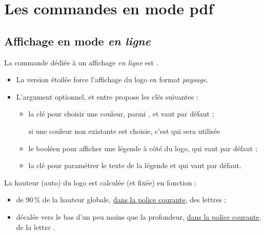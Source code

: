 \documentclass[french,11pt,a4paper]{article}
\begin{document}
\pagebreak

\section{Les commandes en mode pdf}

\subsection{Affichage en mode \textit{en ligne}}

La commande dédiée à un affichage \textit{en ligne} est .

\medskip

\begin{itemize}[leftmargin=*]
	\item La version étoilée force l'affichage du logo en format \textit{paysage}.
	\item L'argument optionnel, et entre \MontreCode{[...]} propose les clés suivantes :
	\begin{itemize}
		\item la clé  pour choisir une couleur, parmi , et vaut  par défaut ;
		
		\hfill{\footnotesize si une couleur non existante est choisie, c'est  qui sera utilisée}
		\item le booléen  pour afficher une légende à côté du logo, qui vaut  par défaut ;
		\item la clé  pour paramétrer le texte de la légende et qui vaut  par défaut.
	\end{itemize}
\end{itemize}

\medskip

La hauteur (auto) du logo est calculée (et fixée) en fonction :

\begin{itemize}
	\item de 90\,\% de la hauteur globale, \underline{dans la police courante}, des lettres  ;
	\item décalée vers le bas d'un peu moins que la profondeur, \underline{dans la police courante}, de la lettre .
\end{itemize}

\medskip
\end{document}
